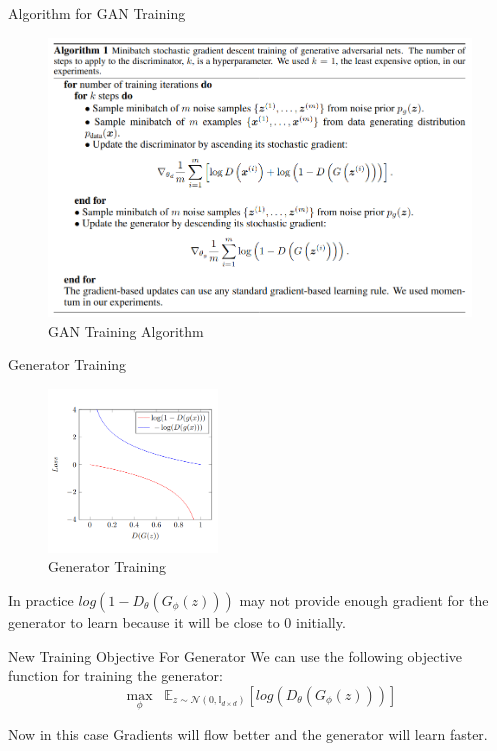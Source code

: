 \begin{frame}{Algorithm for GAN Training}
    \begin{figure}
        \centering
        \includegraphics[width=1\textwidth]{../Images/gan4.png}
        \caption{GAN Training Algorithm}
    \end{figure}
\end{frame}

\begin{frame}{Generator Training}
    \begin{figure}
        \centering
        \includegraphics[width=0.4\textwidth]{../Images/gan3.png}
        \caption{Generator Training}
    \end{figure}
    In practice $log(1 - D_{\theta}(G_{\phi}(z)))$ may not provide enough gradient for the generator to learn because it will be close to 0 initially. 
\end{frame}

\begin{frame}{New Training Objective For Generator}
    We can use the following objective function for training the generator:
    \begin{equation}
        \max_{\phi} \;\; \mathbb{E}_{z \sim \mathcal{N}(0,\mathbb{I}_{d \times d})} \left[ log(D_{\theta}(G_{\phi}(z))) \right]
    \end{equation}
    
    Now in this case Gradients will flow better and the generator will learn faster.
\end{frame}

